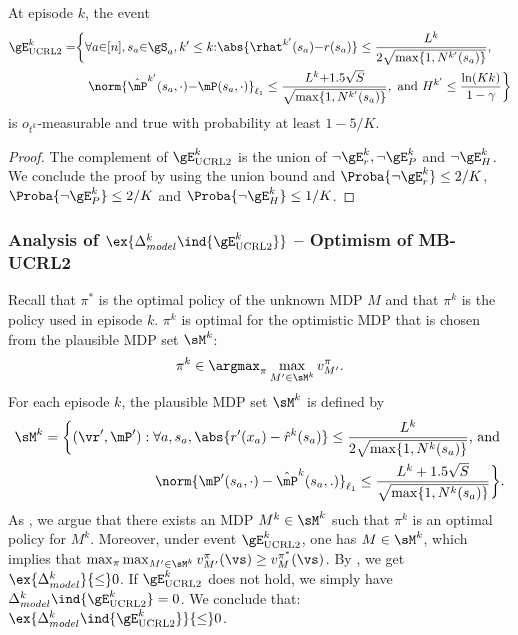 \begin{subappendices}
\begin{lem}
    \label{lem:concentration_ucrl}
    At episode $k$, the event
    \begin{align*}
        \gE_\textnormal{UCRL2}^{k} =
        &\bigg\{ \forall a{\in}[n], s_a{\in}\gS_a, k'\le k{:}
            \abs{\rhat^{k'}(s_a){-}r(s_a)} \le\frac{L^{k}}{2\sqrt{\max\{1,N^{k'}(s_a)\} }}, \\
        &\quad\norm{\hat{\mP}^{k'}(s_a,\cdot) {-}\mP(s_a,\cdot)}_{\ell_1} \le\frac{L^{k}{+}1.5\sqrt{S}}{\sqrt{\max\{1,N^{k'}(s_a)\} }}, \text{ and } H^{k'}\le \frac{\ln(Kk)}{1-\gamma} \bigg\}
    \end{align*}
    is $o_{t^k}$-measurable and true with probability at least $1-5/K$.
\end{lem}
\begin{proof}
    The complement of $\gE^{k}_\text{UCRL2}$ is the union of $\neg \gE^{k}_r, \neg \gE^{k}_P$ and $\neg \gE^{k}_H$. We conclude the proof by using the union bound and $\Proba{\neg \gE^{k}_r} \le 2/K$, $\Proba{\neg \gE^{k}_P} \le 2/K$ and $\Proba{\neg \gE^{k}_H} \le 1/K$. 
\end{proof}

\subsubsection{Analysis of \texorpdfstring{$\ex{\Delta_{model}^k\ind{\gE^{k}_\text{UCRL2}}}$}{} -- Optimism of MB-UCRL2}

Recall that $\pi^*$ is the optimal policy of the unknown MDP $M$ and that $\pi^k$ is the policy used in episode $k$. $\pi^k$ is optimal for the optimistic MDP that is chosen from the plausible MDP set $\sM^k$:
\begin{align*}
    \pi^k \in \argmax_{\pi} \max_{M'\in\sM^k} v^\pi_{M'}.
\end{align*}
For each episode $k$, the plausible MDP set $\sM^k$ is defined by
\begin{align}
    \label{eq:plausible}
    \sM^k=\bigg\{(\vr',\mP'):\forall a, s_a, \abs{r'(x_a)-\hat{r}^{k}(s_a)} \le \frac{L^{k}}{2\sqrt{\max\{1,N^{k}(s_a)\} }} \text{, and }\nonumber\\
    \norm{\mP'(s_a,\cdot)-\hat{\mP}^{k}(s_a, .)}_{\ell_1} \le \frac{L^{k}+1.5\sqrt{S}}{\sqrt{\max\{1,N^{k}(s_a)\} }}\bigg\}.
\end{align}
As \cite{jaksch2010near}, we argue that there exists an MDP $M^k\in\sM^k$ such that $\pi^k$ is an optimal policy for $M^k$. Moreover, under event $\gE_\text{UCRL2}^{k}$, one has $M\in \sM^k$, which implies that $\max_{\pi}\max_{M'\in \sM^k} v^{\pi}_{M'}(\vs)\ge v^{\pi^*}_M(\vs)$. By , we get $\ex{\Delta_{model}^k}{\le} 0$.
If $\gE_\text{UCRL2}^{k}$ does not hold, we simply have $\Delta_{model}^k\ind{\gE^{k}_\text{UCRL2}}=0$. We conclude that: $\ex{\Delta_{model}^k\ind{\gE_\text{UCRL2}^{k}}}{\le}0$. 


\end{subappendices}
